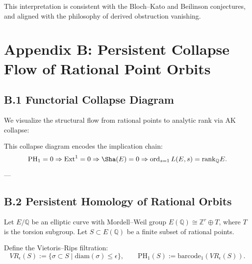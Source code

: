 This interpretation is consistent with the Bloch–Kato and Beilinson conjectures, and aligned with the philosophy of derived obstruction vanishing.


\section*{Appendix B: Persistent Collapse Flow of Rational Point Orbits}

\subsection*{B.1 Functorial Collapse Diagram}

We visualize the structural flow from rational points to analytic rank via AK collapse:

\begin{center}
\end{center}

\medskip

This collapse diagram encodes the implication chain:
\[
\mathrm{PH}_1 = 0 \Rightarrow \mathrm{Ext}^1 = 0 \Rightarrow \Sha(E) = 0 \Rightarrow \operatorname{ord}_{s=1}L(E,s) = \mathrm{rank}_\mathbb{Q}E.
\]

---

\subsection*{B.2 Persistent Homology of Rational Orbits}

Let \( E/\mathbb{Q} \) be an elliptic curve with Mordell--Weil group \( E(\mathbb{Q}) \cong \mathbb{Z}^r \oplus T \),  
where \( T \) is the torsion subgroup. Let \( S \subset E(\mathbb{Q}) \) be a finite subset of rational points.

\begin{definition}
Define the Vietoris--Rips filtration:
\[
VR_\epsilon(S) := \{ \sigma \subset S \mid \text{diam}(\sigma) \leq \epsilon \}, \qquad
\mathrm{PH}_1(S) := \text{barcode}_1(VR_\epsilon(S)).
\]
\end{definition}

